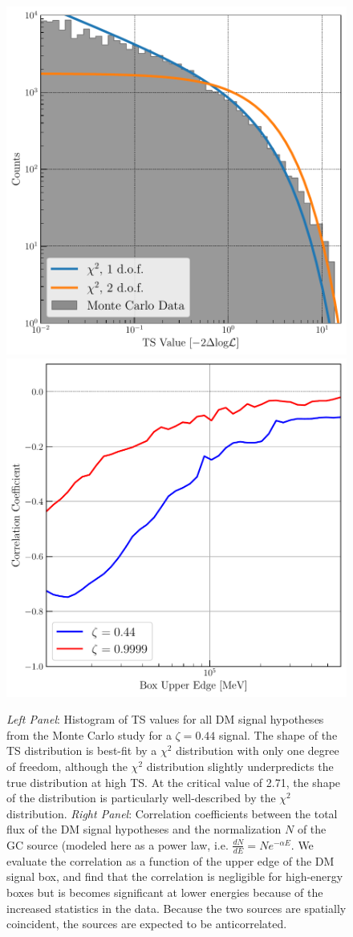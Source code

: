 \begin{figure}[ht] 
\begin{center}
\includegraphics[width=0.45\columnwidth]{figures/ts_hist.pdf}
\includegraphics[width=0.45\columnwidth]{figures/correlation_coefficients.pdf}
\noindent
\caption{ 
\label{fig:correlations}
{\it Left Panel}: Histogram of TS values for all DM signal hypotheses from the Monte Carlo study for a $\zeta=0.44$ signal. The shape of the TS distribution is best-fit by a $\chi^2$ distribution with only one degree of freedom, although the $\chi^2$ distribution slightly underpredicts the true distribution at high TS. At the critical value of 2.71, the shape of the distribution is particularly well-described by the $\chi^2$ distribution. 
{\it Right Panel}: Correlation coefficients between the total flux of the DM signal hypotheses and the normalization $N$ of the GC source (modeled here as a power law, i.e. $\frac{dN}{dE} = Ne^{-\alpha E}$.
We evaluate the correlation as a function of the upper edge of the DM signal box, and find that the correlation is negligible for high-energy boxes but is becomes significant at lower energies because of the increased statistics in the data.
Because the two sources are spatially coincident, the sources are expected to be anticorrelated.
}
\end{center}
\end{figure}

